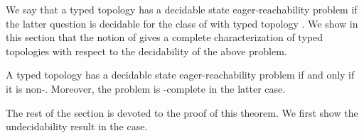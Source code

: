 \documentclass{LMCS}
\newenvironment{theorem}{\begin{thm}}{\end{thm}}
\begin{document}
We say that a typed topology  has a decidable \rqcp state
eager-reachability problem if the latter question is decidable for the class of
\rqcp with typed topology .  We show in this section that the notion of
\convergence gives a complete characterization of typed topologies
with respect to the decidability of the above problem.

\begin{theorem}\label{thm:conv}
  A typed topology has a decidable \rqcp state
 eager-reachability problem  if and only if it is non-\converging.
  Moreover, the problem is \dexptime-complete in the latter case.
\end{theorem}

The rest of the section is devoted to the proof of this theorem.
We first show the undecidability result in the \converging case.
\end{document}
